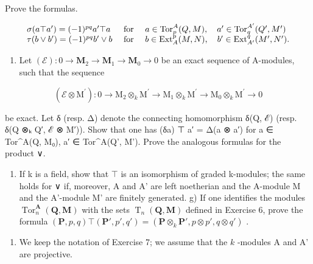 Prove the formulas.

\[
\begin{array}{l l} \sigma (a \top a ^ {\prime}) = (- 1) ^ {p q} a ^ {\prime} \top a & \text { for } \quad a \in \operatorname{Tor} _ {p} ^ {A} (Q, M), \quad a ^ {\prime} \in \operatorname{Tor} _ {q} ^ {A ^ {\prime}} (Q ^ {\prime}, M ^ {\prime}) \\ \tau (b \vee b ^ {\prime}) = (- 1) ^ {p q} b ^ {\prime} \vee b & \text { for } \quad b \in \operatorname{Ext} _ {A} ^ {p} (M, N), \quad b ^ {\prime} \in \operatorname{Ext} _ {A ^ {\prime}} ^ {q} (M ^ {\prime}, N ^ {\prime}). \end{array}
\]

\begin{enumerate}
\def\labelenumi{\alph{enumi})}
\setcounter{enumi}{4}
\tightlist
\item
  Let \((\mathcal{E}):0\to \mathbf{M}_2\to \mathbf{M}_1\to \mathbf{M}_0\to 0\) be an exact sequence of A-modules, such that the sequence
\end{enumerate}

\[
(\mathcal {E} \otimes \mathrm{M} ^ {\prime}): 0 \rightarrow \mathrm{M} _ {2} \otimes_ {k} \mathrm{M} ^ {\prime} \rightarrow \mathrm{M} _ {1} \otimes_ {k} \mathrm{M} ^ {\prime} \rightarrow \mathrm{M} _ {0} \otimes_ {k} \mathrm{M} ^ {\prime} \rightarrow 0
\]

be exact. Let δ (resp. Δ) denote the connecting homomorphism δ(Q, ℰ) (resp. δ(Q ⊗ₖ Q′, ℰ ⊗ M′)). Show that one has (δa) ⊤ a′ = Δ(a ⊗ a′) for a ∈ Tor\^{}A(Q, M₀), a′ ∈ Tor\^{}A(Q', M'). Prove the analogous formulas for the product ∨.

\begin{enumerate}
\def\labelenumi{\alph{enumi})}
\setcounter{enumi}{5}
\tightlist
\item
  If k is a field, show that \(\top\) is an isomorphism of graded k-modules; the same holds for ∨ if, moreover, A and A' are left noetherian and the A-module M and the A'-module M' are finitely generated. g) If one identifies the modules \(\operatorname{Tor}_{n}^{\mathbf{A}}(\mathbf{Q},\mathbf{M})\) with the sets \(\operatorname{T}_{n}(\mathbf{Q},\mathbf{M})\) defined in Exercise 6, prove the formula \((\mathbf{P},p,q)\top(\mathbf{P}',p',q')=(\mathbf{P}\otimes_{k}\mathbf{P}',p\otimes p',q\otimes q')\) .
\end{enumerate}

\begin{enumerate}
\def\labelenumi{\arabic{enumi})}
\setcounter{enumi}{7}
\tightlist
\item
  We keep the notation of Exercise 7; we assume that the \(k\) -modules A and A' are projective.
\end{enumerate}

